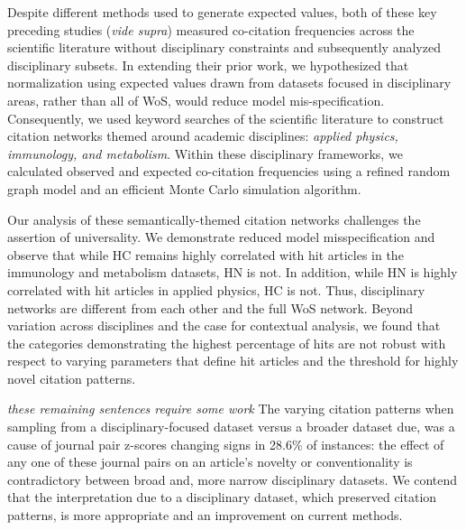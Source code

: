 \documentclass[NETN]{stjour}
\begin{document}
Despite different methods used to generate expected values, both of these key preceding studies (\emph{vide supra}) measured co-citation frequencies across the scientific literature without disciplinary constraints and subsequently analyzed disciplinary subsets. In extending their prior work, we hypothesized that normalization using expected values drawn from datasets focused in disciplinary areas, rather than all of WoS, would reduce model mis-specification.  Consequently, we used keyword searches of the scientific literature to construct citation networks themed around academic disciplines: \emph{applied physics, immunology, and metabolism}. Within these disciplinary frameworks, we calculated observed and expected co-citation frequencies using a refined random graph model and an efficient Monte Carlo simulation algorithm. 

Our analysis of these semantically-themed citation networks challenges the assertion of universality. We demonstrate reduced model misspecification and observe that while HC remains highly correlated with hit articles in the immunology and metabolism datasets, HN is not. In addition, while HN is highly correlated with hit articles in applied physics, HC is not. Thus, disciplinary networks are different from each other and the full WoS network. Beyond variation across disciplines and the case for contextual analysis, we found that the categories demonstrating the highest percentage of hits are not robust with respect to varying parameters that define hit articles and the threshold for highly novel citation patterns.

\emph{these remaining sentences require some work}
The varying citation patterns when sampling from a disciplinary-focused dataset versus a broader dataset due, was a cause of journal pair z-scores changing signs in 28.6\% of instances: the effect of any one of these journal pairs on an article's novelty or conventionality is contradictory between broad and, more narrow disciplinary datasets. We contend that the interpretation due to a disciplinary dataset, which preserved citation patterns, is more appropriate and an improvement on current methods. 
\end{document}
